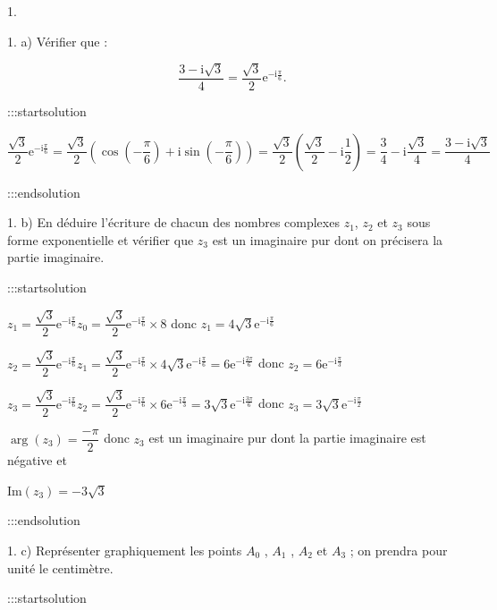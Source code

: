 \documentclass{cornouaille}
\begin{document}
1. 




1. a)  Vérifier que :


$$
\dfrac{3 - \text{i}\sqrt{3}}{4} = \dfrac{\sqrt{3}}{2}\text{e}^{- \text{i}\frac{\pi}{6}}.
$$



:::startsolution

$\dfrac{\sqrt{3}}{2} \text{e}^{-\text{i} \frac{\pi}{6}} = \dfrac{\sqrt{3}}{2} \left( \cos\left(-\dfrac{\pi}{6}\right) + \text{i}\sin\left(-\dfrac{\pi}{6}\right) \right) = \dfrac{\sqrt{3}}{2} \left( \dfrac{\sqrt{3}}{2} - \text{i}\dfrac{1}{2} \right) = \dfrac{3}{4} - \text{i} \dfrac{\sqrt{3}}{4} = \dfrac{3-\text{i}\sqrt{3}}{4}$


:::endsolution


1. b)  En déduire l'écriture de chacun des nombres complexes $z_1$,  $z_2$ et $z_3$ sous forme exponentielle et vérifier que $z_3$ est un imaginaire pur dont on précisera la partie imaginaire.


:::startsolution

$z_1=\dfrac{\sqrt{3}}{2} \text{e}^{-\text{i} \frac{\pi}{6}}z_0=\dfrac{\sqrt{3}}{2} \text{e}^{-\text{i} \frac{\pi}{6}} \times 8$ donc $\boxed{ z_1=4\sqrt{3} \text{e}^{-\text{i} \frac{\pi}{6}} }$\smallskip

$z_2=\dfrac{\sqrt{3}}{2} \text{e}^{-\text{i} \frac{\pi}{6}}z_1 = \dfrac{\sqrt{3}}{2} \text{e}^{-\text{i} \frac{\pi}{6}} \times 4\sqrt{3} \text{e}^{-\text{i} \frac{\pi}{6}} = 6 \text{e}^{-\text{i} \frac{2\pi}{6}}$ donc $\boxed{ z_2=6 \text{e}^{-\text{i} \frac{\pi}{3}} }$\smallskip

$z_3=\dfrac{\sqrt{3}}{2} \text{e}^{-\text{i} \frac{\pi}{6}}z_2 = \dfrac{\sqrt{3}}{2} \text{e}^{-\text{i} \frac{\pi}{6}} \times 6 \text{e}^{-\text{i} \frac{\pi}{3}} = 3\sqrt{3} \text{e}^{-\text{i} \frac{3\pi}{6}}$ donc $\boxed{ z_3=3\sqrt{3} \text{e}^{-\text{i} \frac{\pi}{2}} }$\medskip

$\arg(z_3) = \dfrac{-\pi}{2}$ donc $z_3$ est un imaginaire pur dont la partie imaginaire est négative et

$\boxed{ \text{Im}\left(z_3\right) = - 3\sqrt{3} }$


:::endsolution


1. c)  Représenter graphiquement les points $A_0$ , $A_1$ , $A_2$ et $A_3$ ; on prendra pour unité le centimètre.


:::startsolution
\end{document}
